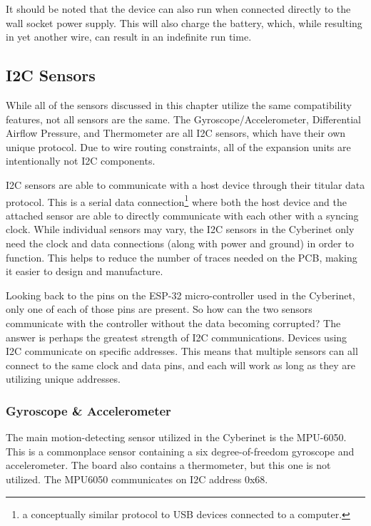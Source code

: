 It should be noted that the device can also run when connected directly to the wall socket power supply. This will also charge the battery, which, while resulting in yet another wire, can result in an indefinite run time.


\subsection{I2C Sensors}
While all of the sensors discussed in this chapter utilize the same compatibility features, not all sensors are the same. The Gyroscope/Accelerometer, Differential Airflow Pressure, and Thermometer are all I2C sensors, which have their own unique protocol. Due to wire routing constraints, all of the expansion units are intentionally not I2C components.

I2C sensors are able to communicate with a host device through their titular data protocol. This is a serial data connection\footnote{a conceptually similar protocol to USB devices connected to a computer.} where both the host device and the attached sensor are able to directly communicate with each other with a syncing clock. While individual sensors may vary, the I2C sensors in the Cyberinet only need the clock and data connections (along with power and ground) in order to function. This helps to reduce the number of traces needed on the PCB, making it easier to design and manufacture.

Looking back to the pins on the ESP-32 micro-controller used in the Cyberinet, only one of each of those pins are present. So how can the two sensors communicate with the controller without the data becoming corrupted? The answer is perhaps the greatest strength of I2C communications. Devices using I2C communicate on specific addresses. This means that multiple sensors can all connect to the same clock and data pins, and each will work as long as they are utilizing unique addresses. 


\subsubsection{Gyroscope \& Accelerometer}

The main motion-detecting sensor utilized in the Cyberinet is the MPU-6050. This is a commonplace sensor containing a six degree-of-freedom gyroscope and accelerometer. The board also contains a thermometer, but this one is not utilized. 
The MPU6050 communicates on I2C address 0x68.

